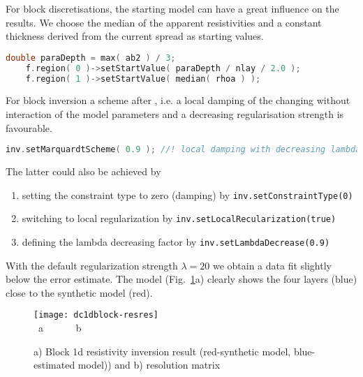 For block discretisations, the starting model can have a great influence on the results.
We choose the median of the apparent resistivities and a constant thickness derived from the current spread as starting values.
\begin{lstlisting}[language=C++]
    double paraDepth = max( ab2 ) / 3;		
    f.region( 0 )->setStartValue( paraDepth / nlay / 2.0 );
    f.region( 1 )->setStartValue( median( rhoa ) );
\end{lstlisting}

For block inversion a scheme after \cite{marquardt}, i.e. a local damping of the changing without interaction of the model parameters and a decreasing regularisation strength is favourable.
\begin{lstlisting}[language=C++]
    inv.setMarquardtScheme( 0.9 ); //! local damping with decreasing lambda
\end{lstlisting}

The latter could also be achieved by \begin{enumerate}
	\item setting the constraint type to zero (damping) by \lstinline|inv.setConstraintType(0)|
	\item switching to local regularization by \lstinline|inv.setLocalRecularization(true)|
	\item defining the lambda decreasing factor by \lstinline|inv.setLambdaDecrease(0.9)|
\end{enumerate}


With the default regularization strength $\lambda=20$ we obtain a data fit slightly below the error estimate.
The model (Fig.~\ref{fig:dc1dblock-resres}a) clearly shows the four layers (blue) close to the synthetic model (red).

\begin{figure}[htbp]
\centering\texttt{[image: dc1dblock-resres]}\\[-3ex]
~\hfill a\hfill ~ \hfill ~~~~~b \hfill ~ \hfill ~ \hfill ~
\caption{a) Block 1d resistivity inversion result (red-synthetic model, blue-estimated model)) and b) resolution matrix}\label{fig:dc1dblock-resres}
\end{figure}

